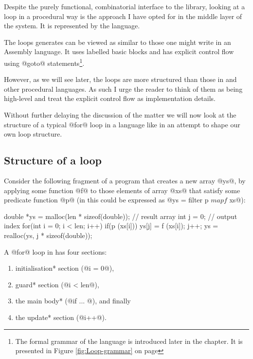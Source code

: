 \documentclass[preamble.tex]{subfiles}
\begin{document}
Despite the purely functional, combinatorial interface to the library, looking at a loop in a procedural way is the approach I have opted for in the middle layer of the system. It is represented by the \Loop language.\iloop

The loops \LiveFusion generates can be viewed as similar to those one might write in an Assembly language. It uses labelled basic blocks and has explicit control flow using @goto@ statements\footnote{The formal grammar of the \Loop language is introduced later in the chapter. It is presented in Figure \ref{fig:Loop-grammar} on page \pageref{fig:Loop-grammar}}.

However, as we will see later, the loops are more structured than those in \C and other procedural languages. As such I urge the reader to think of them as being high-level and treat the explicit control flow as implementation details.


Without further delaying the discussion of the matter we will now look at the structure of a typical @for@ loop in a language like \C in an attempt to shape our own loop structure.


\subsection{Structure of a  loop}

Consider the following fragment of a \C program that creates a new array @ys@, by applying some function @f@ to those elements of array @xs@ that satisfy some predicate function @p@ (in \Haskell this could be expressed as @ys = filter p $ map f $ xs@):

\begin{ccode}[numbers=left, label=lst:filterMapC]
double *ys = malloc(len * sizeof(double)); // result array
int j = 0;                                 // output index
for(int i = 0; i < len; i++) {
    if(p (xs[i])) {
        ys[j] = f (xs[i]);
        j++;
    }
}
ys = realloc(ys, j * sizeof(double));
\end{ccode}

A @for@ loop in \C has four sections:

\begin{enumerate}
\halfspacing
\item \*initialisation* section (@i = 0@),
\item \*guard* section (@i < len@),
\item the main \*body* (@if ... @), and finally
\item the \*update* section (@i++@).
\end{enumerate}
\end{document}
